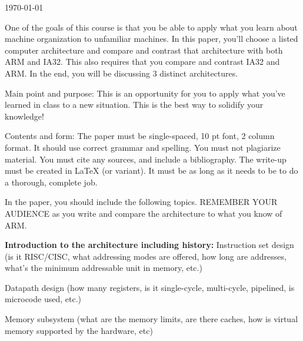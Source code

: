 \documentclass[letterpaper,12pt,titlepage]{article}
\begin{document}
\begin{titlepage}
{\large \today}\\[3cm] %


 

\vfill %

\end{titlepage}

\newpage
One of the goals of this course is that you be able to apply what you learn about machine organization to unfamiliar machines. In this paper, you'll choose a listed computer architecture and compare and contrast that architecture with both ARM and IA32. This also requires that you compare and contrast IA32 and ARM. In the end, you will be discussing 3 distinct architectures.

Main point and purpose: This is an opportunity for you to apply what you've learned in class to a new situation. This is the best way to solidify your knowledge!

Contents and form: The paper must be single-spaced, 10 pt font, 2 column format. It should use correct grammar and spelling. You must not plagiarize material. You must cite any sources, and include a bibliography. The write-up must be created in LaTeX (or variant). It must be as long as it needs to be to do a thorough, complete job.

In the paper, you should include the following topics. REMEMBER YOUR AUDIENCE as you write and compare the architecture to what you know of ARM.

\textbf{Introduction to the architecture including history:}
Instruction set design (is it RISC/CISC, what addressing modes are offered, how long are addresses, what's the minimum addressable unit in memory, etc.)

Datapath design (how many registers, is it single-cycle, multi-cycle, pipelined, is microcode used, etc.)

Memory subsystem (what are the memory limits, are there caches, how is virtual memory supported by the hardware, etc)
\end{document}
